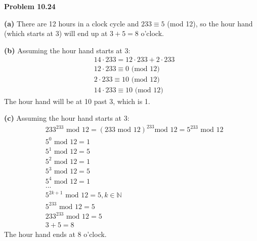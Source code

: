 \documentclass[fleqn]{article}
\begin{document}
\newpage
{\Large\bf Problem 10.24}\vspace{1em}\par
\textbf{(a)} There are 12 hours in a clock cycle and $233 \equiv 5$ (mod 12), so the hour hand (which starts at 3) will end up at $3+5=8$ o'clock.\vspace{1em}\par
\textbf{(b)} Assuming the hour hand starts at 3:
\begin{align*}
	&14 \cdot 233 = 12 \cdot 233 + 2 \cdot 233\\
	&12 \cdot 233 \equiv 0 \text{ (mod 12)}\\
	&2 \cdot 233 \equiv 10 \text{ (mod 12)}\\
	&14 \cdot 233 \equiv 10 \text{ (mod 12)}
\end{align*}
The hour hand will be at 10 past 3, which is 1.\\\par
\textbf{(c)} Assuming the hour hand starts at 3:
\begin{align*}
	&233^{233} \text{ mod } 12 = \left(233 \text{ mod } 12\right)^{233} \text{mod 12} = 5^{233} \text{ mod } 12\\
	&5^0 \text{ mod } 12 = 1\\
	&5^1 \text{ mod } 12 = 5\\
	&5^2 \text{ mod } 12 = 1\\
	&5^3 \text{ mod } 12 = 5\\
	&5^4 \text{ mod } 12 = 1\\
	&...\\
	&5^{2k+1} \text{ mod } 12 = 5, k \in \mathbb{N}\\
	&5^{233} \text{ mod } 12 = 5\\
	&233^{233} \text{ mod } 12 = 5\\
	&3+5=8
\end{align*}
The hour hand ends at 8 o'clock.
\end{document}

